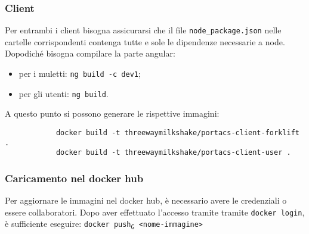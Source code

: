     \subsubsection{Client}
        Per entrambi i client bisogna assicurarsi che il file \texttt{node\_package.json} nelle cartelle corrispondenti contenga tutte e sole le dipendenze necessarie a node. Dopodiché bisogna compilare la parte angular:
        \begin{itemize}
            \item per i muletti: \texttt{ng build -c dev1};
            \item per gli utenti: \texttt{ng build}.
        \end{itemize}
        A questo punto si possono generare le rispettive immagini:
        \begin{verbatim}
            docker build -t threewaymilkshake/portacs-client-forklift .
            docker build -t threewaymilkshake/portacs-client-user .
        \end{verbatim}


    \subsubsection{Caricamento nel docker hub}
        \noindent Per aggiornare le immagini nel docker hub, è necessario avere le credenziali o essere collaboratori. Dopo aver effettuato l'accesso tramite tramite \texttt{docker login}, è sufficiente eseguire: \texttt{docker push\textsubscript{G} <nome-immagine>}












